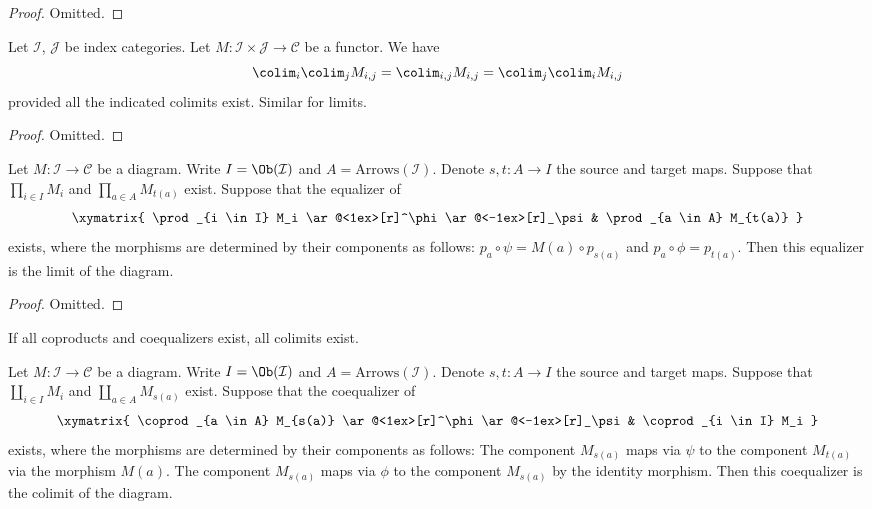 \begin{proof}
Omitted.
\end{proof}


\begin{lemma}
\label{lemma-colimits-commute}
Let $\mathcal{I}$, $\mathcal{J}$ be index categories.
Let $M : \mathcal{I} \times \mathcal{J} \to \mathcal{C}$ be a functor.
We have
$$
\colim_i \colim_j M_{i, j}
=
\colim_{i, j} M_{i, j}
=
\colim_j \colim_i M_{i, j}
$$
provided all the indicated colimits exist. Similar for limits.
\end{lemma}

\begin{proof}
Omitted.
\end{proof}

\begin{lemma}
\label{lemma-limits-products-equalizers}
Let $M : \mathcal{I} \to \mathcal{C}$ be a diagram.
Write $I = \Ob(\mathcal{I})$ and $A = \text{Arrows}(\mathcal{I})$.
Denote $s, t : A \to I$ the source and target maps.
Suppose that $\prod_{i \in I} M_i$ and $\prod_{a \in A} M_{t(a)}$
exist. Suppose that the equalizer of
$$
\xymatrix{
\prod_{i \in I} M_i
\ar@<1ex>[r]^\phi \ar@<-1ex>[r]_\psi
&
\prod_{a \in A} M_{t(a)}
}
$$
exists, where the morphisms are determined by their components
as follows: $p_a \circ \psi = M(a) \circ p_{s(a)}$
and $p_a \circ \phi = p_{t(a)}$. Then this equalizer is the
limit of the diagram.
\end{lemma}

\begin{proof}
Omitted.
\end{proof}


\begin{lemma}
\label{lemma-colimits-coproducts-coequalizers}
\begin{slogan}
If all coproducts and coequalizers exist, all colimits exist.
\end{slogan}
Let $M : \mathcal{I} \to \mathcal{C}$ be a diagram.
Write $I = \Ob(\mathcal{I})$ and $A = \text{Arrows}(\mathcal{I})$.
Denote $s, t : A \to I$ the source and target maps.
Suppose that $\coprod_{i \in I} M_i$ and $\coprod_{a \in A} M_{s(a)}$
exist. Suppose that the coequalizer of
$$
\xymatrix{
\coprod_{a \in A} M_{s(a)}
\ar@<1ex>[r]^\phi \ar@<-1ex>[r]_\psi
&
\coprod_{i \in I} M_i
}
$$
exists, where the morphisms are determined by their components
as follows: The component $M_{s(a)}$ maps via $\psi$
to the component $M_{t(a)}$ via the morphism $M(a)$.
The component $M_{s(a)}$ maps via $\phi$ to the component
$M_{s(a)}$ by the identity morphism. Then this coequalizer is the
colimit of the diagram.
\end{lemma}

